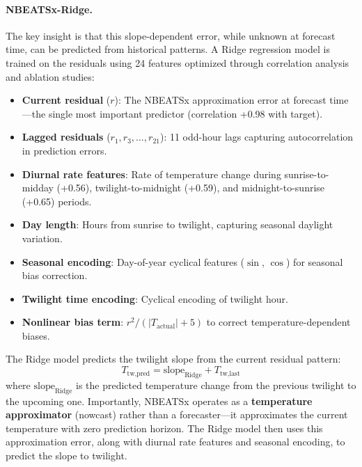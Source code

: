 \documentclass[11pt]{article}
\begin{document}
\paragraph{NBEATSx-Ridge.}
The key insight is that this slope-dependent error, while unknown at forecast time, can be predicted from historical patterns. A Ridge regression model is trained on the residuals using 24 features optimized through correlation analysis and ablation studies:
\begin{itemize}
    \item \textbf{Current residual} ($r$): The NBEATSx approximation error at forecast time---the single most important predictor (correlation +0.98 with target).
    \item \textbf{Lagged residuals} ($r_{1}, r_{3}, \ldots, r_{21}$): 11 odd-hour lags capturing autocorrelation in prediction errors.
    \item \textbf{Diurnal rate features}: Rate of temperature change during sunrise-to-midday (+0.56), twilight-to-midnight (+0.59), and midnight-to-sunrise (+0.65) periods.
    \item \textbf{Day length}: Hours from sunrise to twilight, capturing seasonal daylight variation.
    \item \textbf{Seasonal encoding}: Day-of-year cyclical features ($\sin$, $\cos$) for seasonal bias correction.
    \item \textbf{Twilight time encoding}: Cyclical encoding of twilight hour.
    \item \textbf{Nonlinear bias term}: $r^2 / (|T_{\text{actual}}| + 5)$ to correct temperature-dependent biases.
\end{itemize}

The Ridge model predicts the twilight slope from the current residual pattern:
\begin{equation}
T_{\text{tw,pred}} = \text{slope}_{\text{Ridge}} + T_{\text{tw,last}}
\end{equation}
where $\text{slope}_{\text{Ridge}}$ is the predicted temperature change from the previous twilight to the upcoming one. Importantly, NBEATSx operates as a \textbf{temperature approximator} (nowcast) rather than a forecaster---it approximates the current temperature with zero prediction horizon. The Ridge model then uses this approximation error, along with diurnal rate features and seasonal encoding, to predict the slope to twilight.
\end{document}
